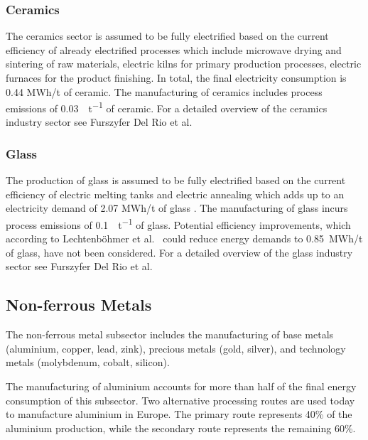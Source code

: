 \subsubsection*{Ceramics}

The ceramics sector is assumed to be fully electrified based on the current
efficiency of already electrified processes which include microwave drying and
sintering of raw materials, electric kilns for primary production processes,
electric furnaces for the product finishing. In total, the final
electricity consumption is 0.44 MWh/t of ceramic. The manufacturing of ceramics
includes process emissions of \SI{0.03}{\tco\per\tonne} of ceramic. For a
detailed overview of the ceramics industry sector see Furszyfer Del Rio et
al.

\subsubsection*{Glass}

The production of glass is assumed to be fully electrified based on the current
efficiency of electric melting tanks and electric annealing which adds up to an
electricity demand of 2.07 MWh\el/t of glass
. The manufacturing of glass incurs
process emissions of \SI{0.1}{\tco\per\tonne} of glass. Potential efficiency
improvements, which according to Lechtenböhmer et al.~
could reduce energy demands to 0.85~MWh\el/t of glass, have not been considered.
For a detailed overview of the glass industry sector see Furszyfer Del Rio et
al.~

\subsection{Non-ferrous Metals}
\label{sec:si:industry:nfm}

The non-ferrous metal subsector includes the manufacturing of base metals
(aluminium, copper, lead, zink), precious metals (gold, silver), and technology
metals (molybdenum, cobalt, silicon).

The manufacturing of aluminium accounts for more than half of the final energy
consumption of this subsector. Two alternative processing routes are
used today to manufacture aluminium in Europe. The primary route represents 40\%
of the aluminium production, while the secondary route represents the remaining
60\%.

